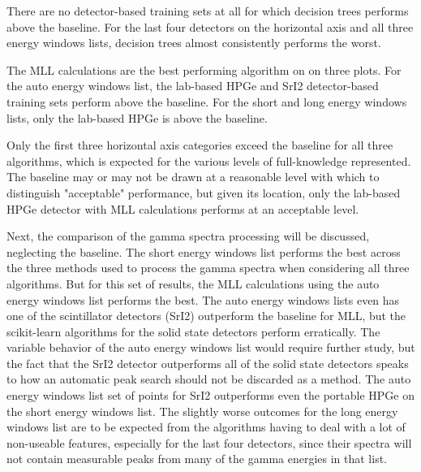 There are no detector-based training sets at all for which decision trees
performs above the baseline. For the last four detectors on the horizontal axis
and all three energy windows lists, decision trees almost consistently performs
the worst. 

The \gls{MLL} calculations are the best performing algorithm on on three plots.
For the auto energy windows list, the lab-based \gls{HPGe} and \gls{SrI2}
detector-based training sets perform above the baseline. For the short and long
energy windows lists, only the lab-based \gls{HPGe} is above the baseline. 

Only the first three horizontal axis categories exceed the baseline for all
three algorithms, which is expected for the various levels of full-knowledge
represented. The baseline may or may not be drawn at a reasonable level with
which to distinguish "acceptable" performance, but given its location, only the
lab-based \gls{HPGe} detector with \gls{MLL} calculations performs at an
acceptable level.

Next, the comparison of the gamma spectra processing will be discussed,
neglecting the baseline.  The short energy windows list performs the best
across the three methods used to process the gamma spectra when considering all
three algorithms.  But for this set of results, the \gls{MLL} calculations
using the auto energy windows list performs the best.  The auto energy windows
lists even has one of the scintillator detectors (\gls{SrI2}) outperform the
baseline for \gls{MLL}, but the scikit-learn algorithms for the solid state
detectors perform erratically.  The variable behavior of the auto energy
windows list would require further study, but the fact that the \gls{SrI2}
detector outperforms all of the solid state detectors speaks to how an
automatic peak search should not be discarded as a method.  The auto energy
windows list set of points for \gls{SrI2} outperforms even the portable
\gls{HPGe} on the short energy windows list.  The slightly worse outcomes for
the long energy windows list are to be expected from the algorithms having to
deal with a lot of non-useable features, especially for the last four
detectors, since their spectra will not contain measurable peaks from many of
the gamma energies in that list. 

